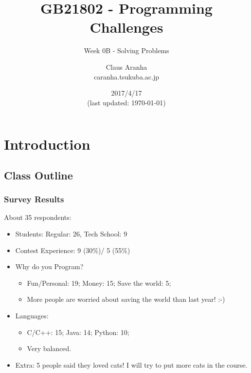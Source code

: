 \documentclass{beamer}
\title[GB21802]{GB21802 - Programming Challenges}
\subtitle[]{Week 0B - Solving Problems}
\author[Claus Aranha]{Claus Aranha\\{\footnotesize caranha\@@cs.tsukuba.ac.jp}}
\institute{Department of Computer Science}
\date{2017/4/17\\{\smaller(last updated: \today)}}
\begin{document}

\section{Introduction}
\subsection{Class Outline}

\begin{frame}
\maketitle
\end{frame}

\begin{frame}
  \frametitle{Survey Results}

  About 35 respondents:
  \begin{itemize}
  \item Students: Regular: 26, Tech School: 9
  \item Contest Experience: 9 (30\%)/ 5 (55\%) 
  \item Why do you Program?
    \begin{itemize}
    \item Fun/Personal: 19; Money: 15; Save the world: 5;
    \item More people are worried about saving the world than last year! :-)
    \end{itemize}
  \item Languages:
    \begin{itemize}
    \item C/C++: 15; Java: 14; Python: 10;
    \item Very balanced.
    \end{itemize}
  \item Extra: 5 people said they loved cats! I will try to put more
    cats in the course.
    
  \end{itemize}

\end{frame}
\end{document}

